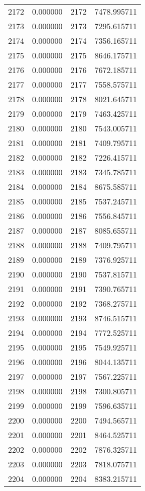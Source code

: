 \documentclass[12pt]{article}
\begin{document}
\begin{longtable}{@{}cccc@{}}
2172 & 0.000000 & 2172 & 7478.995711 \\
2173 & 0.000000 & 2173 & 7295.615711 \\
2174 & 0.000000 & 2174 & 7356.165711 \\
2175 & 0.000000 & 2175 & 8646.175711 \\
2176 & 0.000000 & 2176 & 7672.185711 \\
2177 & 0.000000 & 2177 & 7558.575711 \\
2178 & 0.000000 & 2178 & 8021.645711 \\
2179 & 0.000000 & 2179 & 7463.425711 \\
2180 & 0.000000 & 2180 & 7543.005711 \\
2181 & 0.000000 & 2181 & 7409.795711 \\
2182 & 0.000000 & 2182 & 7226.415711 \\
2183 & 0.000000 & 2183 & 7345.785711 \\
2184 & 0.000000 & 2184 & 8675.585711 \\
2185 & 0.000000 & 2185 & 7537.245711 \\
2186 & 0.000000 & 2186 & 7556.845711 \\
2187 & 0.000000 & 2187 & 8085.655711 \\
2188 & 0.000000 & 2188 & 7409.795711 \\
2189 & 0.000000 & 2189 & 7376.925711 \\
2190 & 0.000000 & 2190 & 7537.815711 \\
2191 & 0.000000 & 2191 & 7390.765711 \\
2192 & 0.000000 & 2192 & 7368.275711 \\
2193 & 0.000000 & 2193 & 8746.515711 \\
2194 & 0.000000 & 2194 & 7772.525711 \\
2195 & 0.000000 & 2195 & 7549.925711 \\
2196 & 0.000000 & 2196 & 8044.135711 \\
2197 & 0.000000 & 2197 & 7567.225711 \\
2198 & 0.000000 & 2198 & 7300.805711 \\
2199 & 0.000000 & 2199 & 7596.635711 \\
2200 & 0.000000 & 2200 & 7494.565711 \\
2201 & 0.000000 & 2201 & 8464.525711 \\
2202 & 0.000000 & 2202 & 7876.325711 \\
2203 & 0.000000 & 2203 & 7818.075711 \\
2204 & 0.000000 & 2204 & 8383.215711 \\

\end{longtable}
\end{document}
